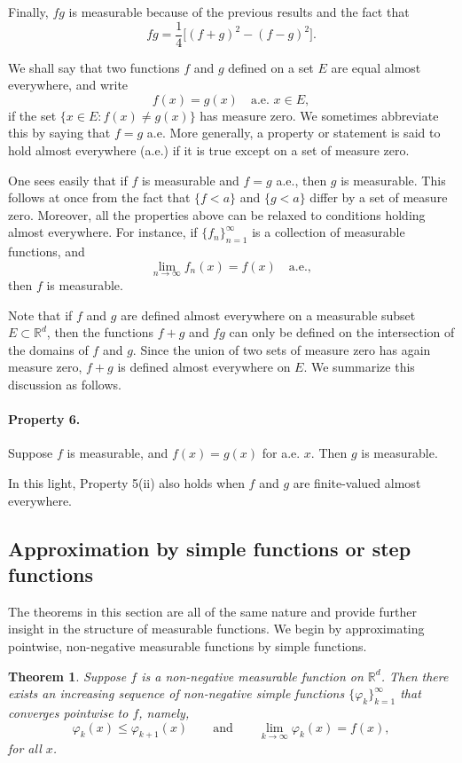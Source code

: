 \documentclass[11pt,openany]{book}
\newtheorem{theorem}{Theorem}[section]
\begin{document}
Finally, $fg$ is measurable because of the previous results and the fact that
\[
 fg=\frac14\bigl[(f+g)^2-(f-g)^2\bigr].
\]

We shall say that two functions $f$ and $g$ defined on a set $E$ are equal almost everywhere, and write
\[
 f(x)=g(x)\quad\text{a.e. }x\in E,
\]
if the set $\{x\in E:f(x)\ne g(x)\}$ has measure zero. We sometimes abbreviate this by saying that $f=g$ a.e. More generally, a property or statement is said to hold almost everywhere (a.e.) if it is true except on a set of measure zero.

One sees easily that if $f$ is measurable and $f=g$ a.e., then $g$ is measurable. This follows at once from the fact that $\{f<a\}$ and $\{g<a\}$ differ by a set of measure zero. Moreover, all the properties above can be relaxed to conditions holding almost everywhere. For instance, if $\{f_n\}_{n=1}^{\infty}$ is a collection of measurable functions, and
\[
 \lim_{n\to\infty}f_n(x)=f(x)\quad\text{a.e.},
\]
then $f$ is measurable.

Note that if $f$ and $g$ are defined almost everywhere on a measurable subset $E\subset\mathbb{R}^d$, then the functions $f+g$ and $fg$ can only be defined on the intersection of the domains of $f$ and $g$. Since the union of two sets of measure zero has again measure zero, $f+g$ is defined almost everywhere on $E$. We summarize this discussion as follows.

\paragraph{Property 6.} Suppose $f$ is measurable, and $f(x)=g(x)$ for a.e. $x$. Then $g$ is measurable.

In this light, Property 5(ii) also holds when $f$ and $g$ are finite-valued almost everywhere.

\subsection{Approximation by simple functions or step functions}

The theorems in this section are all of the same nature and provide further insight in the structure of measurable functions. We begin by approximating pointwise, non-negative measurable functions by simple functions.

\begin{theorem}
Suppose $f$ is a non-negative measurable function on $\mathbb{R}^d$. Then there exists an increasing sequence of non-negative simple functions $\{\varphi_k\}_{k=1}^{\infty}$ that converges pointwise to $f$, namely,
\[
 \varphi_k(x)\le\varphi_{k+1}(x)
 \qquad\text{and}\qquad
 \lim_{k\to\infty}\varphi_k(x)=f(x),
\]
for all $x$.
\end{theorem}
\end{document}
